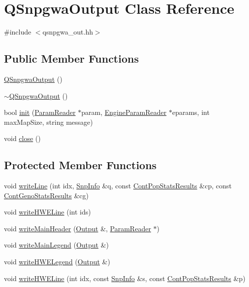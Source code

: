 \hypertarget{classQSnpgwaOutput}{
\section{QSnpgwaOutput Class Reference}
\label{classQSnpgwaOutput}
}


{\ttfamily \#include $<$qsnpgwa\_\-out.hh$>$}

\subsection*{Public Member Functions}
\begin{DoxyCompactItemize}
\item 
\hyperlink{classQSnpgwaOutput_aa98c99a13210b4c8f90efe61afaf1725}{QSnpgwaOutput} ()
\item 
\hyperlink{classQSnpgwaOutput_a7c50b01f0631f1270add06dfb0abf8fc}{$\sim$QSnpgwaOutput} ()
\item 
bool \hyperlink{classQSnpgwaOutput_acea3297b5738eb71047385cd4c5ab1e8}{init} (\hyperlink{classParamReader}{ParamReader} $\ast$param, \hyperlink{classEngineParamReader}{EngineParamReader} $\ast$eparams, int maxMapSize, string message)
\item 
void \hyperlink{classQSnpgwaOutput_ab10d065c1d34ed8be33a423b6d30f297}{close} ()
\end{DoxyCompactItemize}
\subsection*{Protected Member Functions}
\begin{DoxyCompactItemize}
\item 
void \hyperlink{classQSnpgwaOutput_a336d56863a352e38d8a7e5ad1b340cae}{writeLine} (int idx, \hyperlink{classSnpInfo}{SnpInfo} \&q, const \hyperlink{structContPopStatsResults}{ContPopStatsResults} \&cp, const \hyperlink{structContGenoStatsResults}{ContGenoStatsResults} \&cg)
\item 
void \hyperlink{classQSnpgwaOutput_a9574fd93e422682b25033e41a9c3b72b}{writeHWELine} (int ids)
\item 
void \hyperlink{classQSnpgwaOutput_a5feff7620e8e5ba31ea11f2386f98538}{writeMainHeader} (\hyperlink{classOutput}{Output} \&, \hyperlink{classParamReader}{ParamReader} $\ast$)
\item 
void \hyperlink{classQSnpgwaOutput_a8dd9ee1d5afed7e6eb72d1aa525081eb}{writeMainLegend} (\hyperlink{classOutput}{Output} \&)
\item 
void \hyperlink{classQSnpgwaOutput_a2b0ca6d197ec6b9155bc051e29627665}{writeHWELegend} (\hyperlink{classOutput}{Output} \&)
\item 
void \hyperlink{classQSnpgwaOutput_abeeb5f390c652631a711d1aa1f847d87}{writeHWELine} (int idx, const \hyperlink{classSnpInfo}{SnpInfo} \&s, const \hyperlink{structContPopStatsResults}{ContPopStatsResults} \&p)
\end{DoxyCompactItemize}
